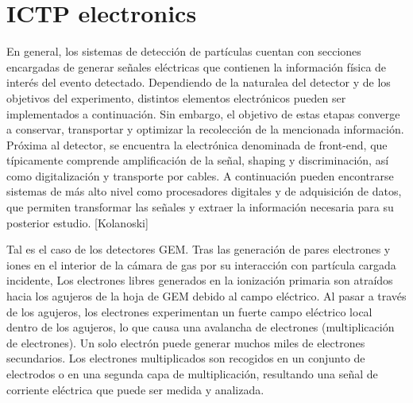 \documentclass[]{book}
\begin{document}
\chapter{ICTP electronics}

\noindent En general, los sistemas de detección de partículas cuentan con secciones encargadas de generar señales eléctricas que contienen la información física de interés del evento detectado. Dependiendo de la naturalea del detector y de los objetivos del experimento, distintos elementos electrónicos pueden ser implementados a continuación. Sin embargo, el objetivo de estas etapas converge a conservar, transportar y optimizar la recolección de la mencionada información. Próxima al detector, se encuentra la electrónica denominada de front-end, que típicamente comprende amplificación de la señal, shaping y discriminación, así como digitalización y transporte por cables. A continuación pueden encontrarse sistemas de más alto nivel como procesadores digitales y de adquisición de datos, que permiten transformar las señales y extraer la información necesaria para su posterior estudio. [Kolanoski]

\noindent Tal es el caso de los detectores GEM. Tras las generación de pares electrones y iones en el interior de la cámara de gas por su interacción con partícula cargada incidente, Los electrones libres generados en la ionización primaria son atraídos hacia los agujeros de la hoja de GEM debido al campo eléctrico. Al pasar a través de los agujeros, los electrones experimentan un fuerte campo eléctrico local dentro de los agujeros, lo que causa una avalancha de electrones (multiplicación de electrones). Un solo electrón puede generar muchos miles de electrones secundarios. Los electrones multiplicados son recogidos en un conjunto de electrodos o en una segunda capa de multiplicación, resultando una señal de corriente eléctrica que puede ser medida y analizada.
\end{document}
